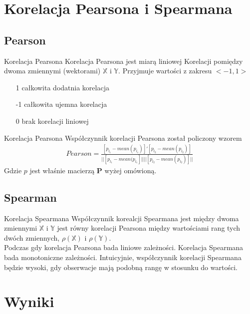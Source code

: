 \documentclass{beamer}
\begin{document}
\section{Korelacja Pearsona i Spearmana}
\subsection{Pearson}
\begin{frame}{Korelacja Pearsona}
Korelacja Pearsona jest miarą liniowej Korelacji pomiędzy dwoma zmiennymi (wektorami) $\mathbb{X}$ i $\mathbb{Y}$. Przyjmuje wartości z zakresu $<-1,1>$
\pause
\begin{itemize}
\item[1] całkowita dodatnia korelacja
\item[-1] całkowita ujemna korelacja
\item[0] brak korelacji liniowej
\end{itemize}

\end{frame}
\begin{frame}{Korelacja Pearsona}
Współczynnik korelacji Pearsona został policzony wzorem
\begin{align*}
\textit{Pearson}=
\frac{[p_{l_1} - \textit{mean}(p_{l_1})]'[p_{l_2} - \textit{mean}(p_{l_2})]}{||[p_{l_1} - \textit{mean}(p_{l_1}]||||[p_{l_2} - \textit{mean}(p_{l_2})]||}
\end{align*}
Gdzie $p$ jest właśnie macierzą \textbf{P} wyżej omówioną.
\end{frame}
\subsection{Spearman}
\begin{frame}{Korelacja Spearmana}
Współczynnik korealcji Spearmana jest między dwoma zmiennymi $\mathbb{X}$ i $\mathbb{Y}$ jest równy korelacji Pearsona między wartościami rang tych dwóch zmiennych, $\rho(\mathbb{X})$ i $\rho(\mathbb{Y})$.
\\
\pause
Podczas gdy korelacja Pearsona bada liniowe zależności. Korelacja Spearmana bada monotoniczne zależności.
\pause
Intuicyjnie, współczynnik korelacji Spearmana będzie wysoki, gdy obserwacje mają podobną rangę w stosunku do wartości. 
\end{frame}

\section{Wyniki}
\end{document}

